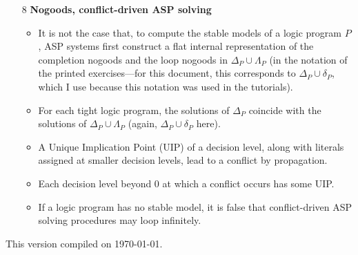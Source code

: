 \documentclass[9pt,a4paper,landscape]{article}
\begin{document}
{\begin{itemize}
	\item[8] \textbf{Nogoods, conflict-driven ASP solving}
	\begin{itemize}[noitemsep]
		\item It is not the case that, to compute the stable models of a logic program $P$, ASP systems first construct a flat internal representation of the completion nogoods and the loop nogoods in $\Delta_P \cup \Lambda_P$ (in the notation of the printed exercises---for this document, this corresponds to  $\Delta_P \cup \delta_P$, which I use because this notation was used in the tutorials).
		\item For each tight logic program, the solutions of $\Delta_P$ coincide with the solutions of $\Delta_P \cup \Lambda_P$ (again, $\Delta_P \cup \delta_P$ here).
		\item A Unique Implication Point (UIP) of a decision level, along with literals assigned at smaller decision levels, lead to a conflict by propagation.
		\item Each decision level beyond 0 at which a conflict occurs has some UIP.
		\item If a logic program has no stable model, it is false that conflict-driven ASP solving procedures may loop infinitely.
	\end{itemize}
\end{itemize}


\vfill \hfill This version compiled on \today.

}
	
\end{document}
